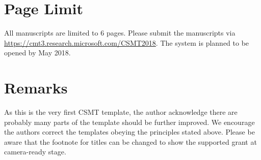 \documentclass[UTF8,a4paper]{article}
\begin{document}
\section{Page Limit}

All manuscripts are limited to 6 pages. Please submit the manuscripts via \url{https://cmt3.research.microsoft.com/CSMT2018}. The system is planned to be opened by May 2018.

\section{Remarks}
As this is the very first CSMT template, the author acknowledge there are probably many parts of the template should be further improved. We encourage the authors correct the templates obeying the principles stated above. Please be aware that the footnote for titles can be changed to show the supported grant at camera-ready stage.



\end{document}
